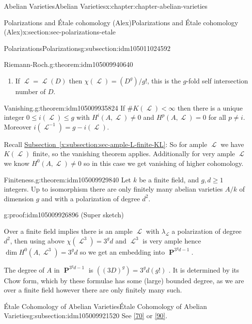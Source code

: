 \documentclass[oneside,10pt,]{book}
\numberwithin{equation}{section}
\newcommand{\sheaf}[1]{\operatorname{\mathcal{#1}}}
\DeclareMathOperator{\PP}{\mathbf{P}}
\newcommand{\lt}{<}
\begin{document}
\begin{chapterptx}{Abelian Varieties}{}{Abelian Varieties}{}{}{x:chapter:chapter-abelian-varieties}
\begin{sectionptx}{Polarizations and Étale cohomology (Alex)}{}{Polarizations and Étale cohomology (Alex)}{}{}{x:section:sec-polarizations-etale}
\begin{subsectionptx}{Polarizations}{}{Polarizations}{}{}{g:subsection:idm105011024592}
\begin{theorem}{Riemann-Roch.}{}{g:theorem:idm105009940640}
\begin{enumerate}
\item{}If \(\sheaf L = \sheaf L(D)\) then \(\chi(\sheaf L) = (D^g)/g!\), this is the \(g\)-fold self intersection number of \(D\).%
\end{enumerate}
%
\end{theorem}
\begin{theorem}{Vanishing.}{}{g:theorem:idm105009935824}%
If \(\#K( \sheaf L)\lt \infty\) then there is a unique integer \(0\le i(\sheaf L) \le g\) with \(H^i(A, \sheaf L) \ne  0\) and \(H^p(A, \sheaf L) = 0\) for all \(p \ne i\). Moreover \(i(\sheaf L^{-1}) = g - i(\sheaf L)\).%
\end{theorem}
Recall \hyperref[x:subsection:sec-ample-L-finite-KL]{Subsection~\ref{x:subsection:sec-ample-L-finite-KL}}: So for ample \(\sheaf L\) we have \(K(\sheaf L)\) finite, so the vanishing theorem applies. Additionally for very ample \(\sheaf L\) we know \(H^0(A,\sheaf L) \ne 0\) so in this case we get vanishing of higher cohomology.%
\begin{theorem}{Finiteness.}{}{g:theorem:idm105009929840}%
Let \(k\) be a finite field, and   \(g,d\ge 1\) integers. Up to isomorphism there are only finitely many abelian varieties \(A/k\) of dimension \(g\) and with a polarization of degree \(d^2\).%
\end{theorem}
\begin{proofptx}{}{g:proof:idm105009926896}
(Super sketch)%
\par
Over a finite field implies there is an ample \(\sheaf L\) with \(\lambda_{\sheaf L}\) a polarization of degree \(d^2\), then using above \(\chi(\sheaf L^3) = 3^g d\) and \(\sheaf L^3\) is very ample hence \(\dim H^0(A, \sheaf L^3) = 3^g d\) so we get an embedding into \(\PP^{3^g d - 1}\).%
\par
The degree of \(A\) in \(\PP^{3^g d - 1}\) is \(((3D)^g) = 3^g d(g!)\) . It is determined by its Chow form, which by these formulae has some (large) bounded degree, as we are over a finite field however there are only finitely many such.%
\end{proofptx}
\end{subsectionptx}
%
%
\typeout{************************************************}
\typeout{************************************************}
%
\begin{subsectionptx}{Étale Cohomology of Abelian Varieties}{}{Étale Cohomology of Abelian Varieties}{}{}{g:subsection:idm105009921520}
See \hyperlink{x:biblio:bib-milne-etale}{[70]} or \hyperlink{x:biblio:bib-tamme}{[90]}.%

\end{subsectionptx}
\end{sectionptx}
\end{chapterptx}
\end{document}

